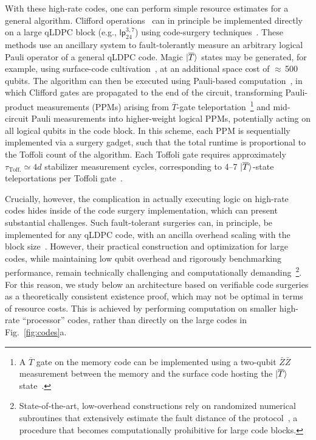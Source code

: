 \documentclass[reprint,twocolumn,secnumarabic,amssymb, aps, prx]{revtex4-2}
\newcommand{\lpmemlarge}{\mbox{$\mathsf{lp}_{24}^{3, 7}$}}
\newcommand{\ttoff}{\tau_\text{Toff.}}
\newcommand{\lket}[1]{\ket{\overline{#1}}}
\begin{document}
With these high-rate codes, one can perform simple resource estimates for a general algorithm. Clifford operations~\cite{bravyi2016trading} can in principle be implemented directly on a large qLDPC block (e.g., $\lpmemlarge$) using code-surgery techniques~\cite{cohen2022low, cross2024improved, he2025extractors}. These methods use an ancillary system to fault-tolerantly measure an arbitrary logical Pauli operator of a general qLDPC code. Magic $\lket{T}$ states may be generated, for example, using surface-code cultivation~\cite{gidney2024magic}, at an additional space cost of $\approx$\,500 qubits. The algorithm can then be executed using Pauli-based computation~\cite{bravyi2016trading}, in which Clifford gates are propagated to the end of the circuit, transforming Pauli-product measurements (PPMs) arising from $\overline{T}$-gate teleportation~\footnote{A $\overline{T}$ gate on the memory code can be implemented using a two-qubit $\bar{Z}\bar{Z}$ measurement between the memory and the surface code hosting the $\lket{T}$ state~\cite{litinski2019game}.} and mid-circuit Pauli measurements into higher-weight logical PPMs, potentially acting on all logical qubits in the code block. In this scheme, each PPM is sequentially implemented via a surgery gadget, such that the total runtime is proportional to the Toffoli count of the algorithm. Each Toffoli gate requires approximately $\ttoff \simeq 4d$ stabilizer measurement cycles, corresponding to 4–7 $\lket{T}$-state teleportations per Toffoli gate~\cite{jones2013low, matthew2013meet, gidney2018halving}.

Crucially, however, the complication in actually executing logic on high-rate codes hides inside of the code surgery implementation, which can present substantial challenges. Such fault-tolerant surgeries can, in principle, be implemented for any qLDPC code, with an ancilla overhead scaling with the block size~\cite{cross2024improved, he2025extractors}. However, their practical construction and optimization for large codes, while maintaining low qubit overhead and rigorously benchmarking performance, remain technically challenging and computationally demanding~\footnote{State-of-the-art, low-overhead constructions rely on randomized numerical subroutines that extensively estimate the fault distance of the protocol~\cite{cross2024improved, zheng2025high}, a procedure that becomes computationally prohibitive for large code blocks.}. For this reason, we study below an architecture based on verifiable code surgeries as a theoretically consistent existence proof, which may not be optimal in terms of resource costs. This is achieved by performing computation on smaller high-rate ``processor'' codes, rather than directly on the large codes in Fig.~\ref{fig:codes}a.
\end{document}
